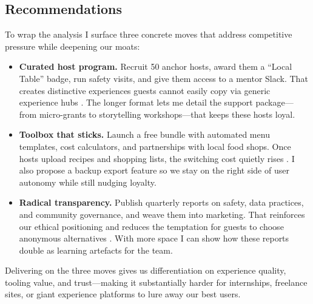 \subsection*{Recommendations}
To wrap the analysis I surface three concrete moves that address competitive pressure while deepening our moats:
\begin{itemize}
  \item \textbf{Curated host program.} Recruit 50 anchor hosts, award them a ``Local Table'' badge, run safety visits, and give them access to a mentor Slack. That creates distinctive experiences guests cannot easily copy via generic experience hubs \citep{Reillier2017}. The longer format lets me detail the support package---from micro-grants to storytelling workshops---that keeps these hosts loyal.
  \item \textbf{Toolbox that sticks.} Launch a free bundle with automated menu templates, cost calculators, and partnerships with local food shops. Once hosts upload recipes and shopping lists, the switching cost quietly rises \citep{FarrellSaloner1986,ShapiroVarian1999}. I also propose a backup export feature so we stay on the right side of user autonomy while still nudging loyalty.
  \item \textbf{Radical transparency.} Publish quarterly reports on safety, data practices, and community governance, and weave them into marketing. That reinforces our ethical positioning and reduces the temptation for guests to choose anonymous alternatives \citep{Choudary2016,Zuboff2019}. With more space I can show how these reports double as learning artefacts for the team.
\end{itemize}
Delivering on the three moves gives us differentiation on experience quality, tooling value, and trust---making it substantially harder for internships, freelance sites, or giant experience platforms to lure away our best users.
